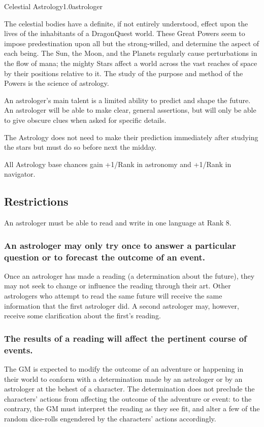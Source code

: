 \documentclass[a4paper]{article}
\begin{document}
\begin{skill}{Celestial Astrology}{1.0}{astrologer}

The celestial bodies have a definite, if not entirely understood,
effect upon the lives of the inhabitants of a DragonQuest world.
These Great Powers seem to impose predestination upon all but the
strong-willed, and determine the aspect of each being.  The Sun, the
Moon, and the Planets regularly cause perturbations in the flow of
mana; the mighty Stars affect a world across the vast reaches of space
by their positions relative to it.  The study of the purpose and
method of the Powers is the science of astrology.

An astrologer's main talent is a limited ability to predict and shape
the future.  An astrologer will be able to make clear, general
assertions, but will only be able to give obscure clues when asked for
specific details.

The Astrology does not need to make their prediction immediately after
studying the stars but must do so before next the midday.

All Astrology base chances gain +1/Rank in astronomy and +1/Rank in
navigator.

\subsection{Restrictions}

An astrologer must be able to read and write in one language at Rank
8.

\subsubsection{An astrologer may only try once to answer a particular
question or to forecast the outcome of an event.}

Once an astrologer has made a reading (\ie a determination about the
future), they may not seek to change or influence the reading through
their art. Other astrologers who attempt to read the same future will
receive the same information that the first astrologer did.  A second
astrologer may, however, receive some clarification about the first's
reading.

\subsubsection{The results of a reading will affect the pertinent course
of events.}

The GM is expected to modify the outcome of an adventure or happening
in their world to conform with a determination made by an astrologer or
by an astrologer at the behest of a character.  The determination does
not preclude the characters' actions from affecting the outcome of the
adventure or event: to the contrary, the GM must interpret the reading
as they see fit, and alter a few of the random dice-rolls engendered
by the characters' actions accordingly.


\end{skill}
\end{document}
